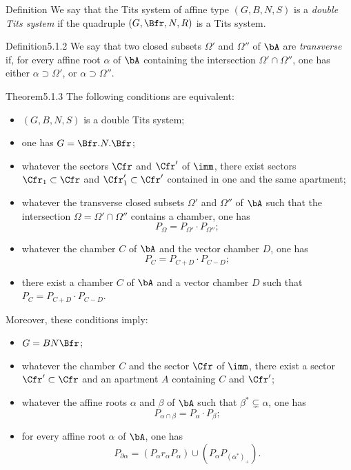 \documentclass[12pt,a4paper,oneside,english]{smfart}
\makeatletter
\newcommand{\btanchor}[1]{\leavevmode\Hy@raisedlink{\hypertarget{bt:#1}{}}}
\theoremstyle{definition}
\theoremstyle{bt}
\makeatother
\begin{document}
\begin{states}{Definition}
We say that the Tits system of affine type $(G,B,N,S)$ is a \emph{double Tits
system} if the quadruple $(G,\Bfr,N,R)$ is a Tits system.
\end{states}

\begin{state}{Definition}{5.1.2}\btanchor{5.1.2}
We say that two closed subsets $\Omega'$ and $\Omega''$ of $\bA$ are
\emph{transverse} if, for every affine root $\alpha$ of $\bA$ containing the
intersection $\Omega'\cap\Omega''$, one has either $\alpha\supset\Omega'$, or
$\alpha\supset\Omega''$.
\end{state}

\begin{state}{Theorem}{5.1.3}\btanchor{5.1.3}
The following conditions are equivalent:
\begin{itemize}
\item[(i)] $(G,B,N,S)$ is a double Tits system;
\item[(ii)] one has $G = \Bfr.N.\Bfr$;
\item[(ii bis)] whatever the sectors $\Cfr$ and $\Cfr'$ of $\imm$, there
exist sectors $\Cfr_1\subset\Cfr$ and $\Cfr'_1\subset\Cfr'$ contained in one
and the same apartment;
\item[(iii)] whatever the transverse closed subsets $\Omega'$ and $\Omega''$
of $\bA$ such that the intersection $\Omega = \Omega'\cap\Omega''$ contains a
chamber, one has
\[ P_{\Omega} = P_{\Omega'}\cdot P_{\Omega''} ; \]
\item[(iv)] whatever the chamber $C$ of $\bA$ and the vector chamber $D$, one
has
\[ P_{C} = P_{C+D}\cdot P_{C-D} ; \]
\item[(v)] there exist a chamber $C$ of $\bA$ and a vector chamber $D$ such
that $P_{C} = P_{C+D}\cdot P_{C-D}$.
\end{itemize}
Moreover, these conditions imply:
\begin{itemize}
\item[(vi)] $G = BN\Bfr$;
\item[(vi bis)] whatever the chamber $C$ and the sector $\Cfr$ of $\imm$,
there exist a sector $\Cfr'\subset\Cfr$ and an apartment $A$ containing $C$
and $\Cfr'$;
\item[(vii)] whatever the affine roots $\alpha$ and $\beta$ of $\bA$ such
that $\beta^{*}\subsetneq\alpha$, one has
\[ P_{\alpha\cap\beta} = P_{\alpha}\cdot P_{\beta} ; \]
\item[(viii)] for every affine root $\alpha$ of $\bA$, one has
\[ P_{\partial\alpha}
   = (P_{\alpha}r_{\alpha}P_{\alpha})\cup(P_{\alpha}P_{(\alpha^{*})_{+}}). \]
\end{itemize}
\end{state}
\end{document}
